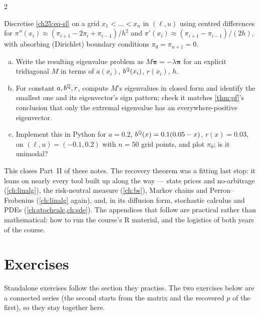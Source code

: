 \begin{paracol}{2}
\begin{exercise}\label{ch25:ex-x-discretize}
Discretise \eqref{ch25:eq-sl} on a grid $x_1<\dots<x_n$ in $(\ell,u)$ using centred differences for
$\pi''(x_i)\approx(\pi_{i+1}-2\pi_i+\pi_{i-1})/h^2$ and $\pi'(x_i)\approx(\pi_{i+1}-\pi_{i-1})/(2h)$, with
absorbing (Dirichlet) boundary conditions $\pi_0=\pi_{n+1}=0$.
\begin{enumerate}[(a)]
  \item Write the resulting eigenvalue problem as
      $M\bm\pi=-\lambda\bm\pi$ for an explicit tridiagonal $M$ in terms of $a(x_i)$, $b^{\mathbb{Q}}(x_i)$, $r(x_i)$, $h$.
  \item For constant $a,b^{\mathbb{Q}},r$, compute $M$'s eigenvalues in closed form and identify the smallest one and its
      eigenvector's sign pattern; check it matches \cref{thm:pf}'s conclusion that only the extremal eigenvalue
      has an everywhere-positive eigenvector.
  \item Implement this in Python for $a=0.2$, $b^{\mathbb{Q}}(x)=0.1(0.05-x)$,
      $r(x)=0.03$, on $(\ell,u)=(-0.1,0.2)$ with $n=50$ grid points, and plot $\pi_0$; is it unimodal?
\end{enumerate}
\end{exercise}

\begin{remark}
This closes Part~II of these notes. The recovery theorem was a fitting last stop: it leans on nearly every
tool built up along the way --- state prices and no-arbitrage (\cref{ch:linalg}), the risk-neutral measure
(\cref{ch:bs}), Markov chains and Perron--Frobenius (\cref{ch:linalg} again), and, in its diffusion form,
stochastic calculus and PDEs (\cref{ch:stochcalc,ch:sde}). The appendices that follow are practical rather
than mathematical: how to run the course's \textsf{R} material, and the logistics of both years of the
course.
\end{remark}

\section*{Exercises}
Standalone exercises follow the section they practise. The two exercises below are a connected series (the second starts from the matrix and the recovered $p$ of the first), so they stay together here.


\end{paracol}
